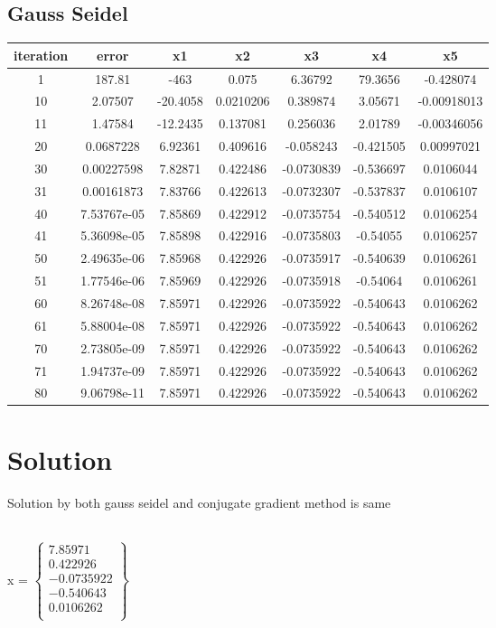 \documentclass[12pt]{article}
\begin{document}
\subsection{Gauss Seidel}
\begin{center}
\begin{tabular}{|c|c|c|c|c|c|c|}
    \hline
    iteration & error & x1 & x2 & x3 & x4 & x5 \\
    \hline
    1 & 187.81 & -463 & 0.075 & 6.36792 & 79.3656 & -0.428074 \\
    \hline
    10 & 2.07507 & -20.4058 & 0.0210206 & 0.389874 & 3.05671 & -0.00918013 \\
    \hline
    11 & 1.47584 & -12.2435 & 0.137081 & 0.256036 & 2.01789 & -0.00346056 \\
    \hline
    20 & 0.0687228 & 6.92361 & 0.409616 & -0.058243 & -0.421505 & 0.00997021 \\
    \hline 
    30 & 0.00227598 & 7.82871 & 0.422486 & -0.0730839 & -0.536697 & 0.0106044 \\ 
    \hline
    31 & 0.00161873 & 7.83766 & 0.422613 & -0.0732307 & -0.537837 & 0.0106107 \\
    \hline
    40 & 7.53767e-05 & 7.85869 & 0.422912 & -0.0735754 & -0.540512 & 0.0106254 \\ 
    \hline
    41 & 5.36098e-05 & 7.85898 & 0.422916 & -0.0735803 & -0.54055 & 0.0106257 \\
    \hline
    50 & 2.49635e-06 & 7.85968 & 0.422926 & -0.0735917 & -0.540639 & 0.0106261 \\ 
    \hline
    51 & 1.77546e-06 & 7.85969 & 0.422926 & -0.0735918 & -0.54064 & 0.0106261 \\
    \hline
    60 & 8.26748e-08 & 7.85971 & 0.422926 & -0.0735922 & -0.540643 & 0.0106262 \\ 
    \hline
    61 & 5.88004e-08 & 7.85971 & 0.422926 & -0.0735922 & -0.540643 & 0.0106262 \\
    \hline
    70 & 2.73805e-09 & 7.85971 & 0.422926 & -0.0735922 & -0.540643 & 0.0106262 \\
    \hline
    71 & 1.94737e-09 & 7.85971 & 0.422926 & -0.0735922 & -0.540643 & 0.0106262 \\
    \hline
    80 & 9.06798e-11 & 7.85971 & 0.422926 & -0.0735922 & -0.540643 & 0.0106262 \\ 
    \hline
\end{tabular}
\end{center}

\section{Solution}
Solution by both gauss seidel and conjugate gradient method is same 
\begin{center}
\\x =
$\begin{Bmatrix}
    7.85971 \\
    0.422926 \\
    -0.0735922 \\
    -0.540643 \\
    0.0106262 \\
\end{Bmatrix}$
\end{center}
\end{document}
